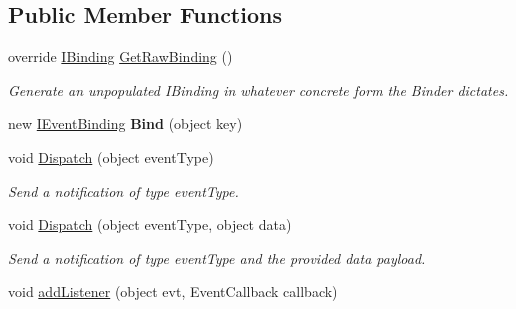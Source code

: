 \subsection*{Public Member Functions}
\begin{DoxyCompactItemize}
\item 
\hypertarget{classstrange_1_1extensions_1_1dispatcher_1_1eventdispatcher_1_1impl_1_1_event_dispatcher_a45e80262b4266392dfe90b5ef5985002}{override \hyperlink{interfacestrange_1_1framework_1_1api_1_1_i_binding}{I\-Binding} \hyperlink{classstrange_1_1extensions_1_1dispatcher_1_1eventdispatcher_1_1impl_1_1_event_dispatcher_a45e80262b4266392dfe90b5ef5985002}{Get\-Raw\-Binding} ()}\label{classstrange_1_1extensions_1_1dispatcher_1_1eventdispatcher_1_1impl_1_1_event_dispatcher_a45e80262b4266392dfe90b5ef5985002}

\begin{DoxyCompactList}\small\item\em Generate an unpopulated I\-Binding in whatever concrete form the Binder dictates. \end{DoxyCompactList}\item 
\hypertarget{classstrange_1_1extensions_1_1dispatcher_1_1eventdispatcher_1_1impl_1_1_event_dispatcher_a42c7118c3b362edefc631de15eb133b8}{new \hyperlink{interfacestrange_1_1extensions_1_1dispatcher_1_1eventdispatcher_1_1api_1_1_i_event_binding}{I\-Event\-Binding} {\bfseries Bind} (object key)}\label{classstrange_1_1extensions_1_1dispatcher_1_1eventdispatcher_1_1impl_1_1_event_dispatcher_a42c7118c3b362edefc631de15eb133b8}

\item 
void \hyperlink{classstrange_1_1extensions_1_1dispatcher_1_1eventdispatcher_1_1impl_1_1_event_dispatcher_a70d8d7740798e10f960c866e03c4639b}{Dispatch} (object event\-Type)
\begin{DoxyCompactList}\small\item\em Send a notification of type event\-Type. \end{DoxyCompactList}\item 
void \hyperlink{classstrange_1_1extensions_1_1dispatcher_1_1eventdispatcher_1_1impl_1_1_event_dispatcher_a14124806e6632e75aa0ff0c02d23483b}{Dispatch} (object event\-Type, object data)
\begin{DoxyCompactList}\small\item\em Send a notification of type event\-Type and the provided data payload. \end{DoxyCompactList}\item 
\hypertarget{classstrange_1_1extensions_1_1dispatcher_1_1eventdispatcher_1_1impl_1_1_event_dispatcher_acd95e78dd533c6b0faa7c057c7d04cce}{void \hyperlink{classstrange_1_1extensions_1_1dispatcher_1_1eventdispatcher_1_1impl_1_1_event_dispatcher_acd95e78dd533c6b0faa7c057c7d04cce}{add\-Listener} (object evt, Event\-Callback callback)}\label{classstrange_1_1extensions_1_1dispatcher_1_1eventdispatcher_1_1impl_1_1_event_dispatcher_acd95e78dd533c6b0faa7c057c7d04cce}


\end{DoxyCompactItemize}
